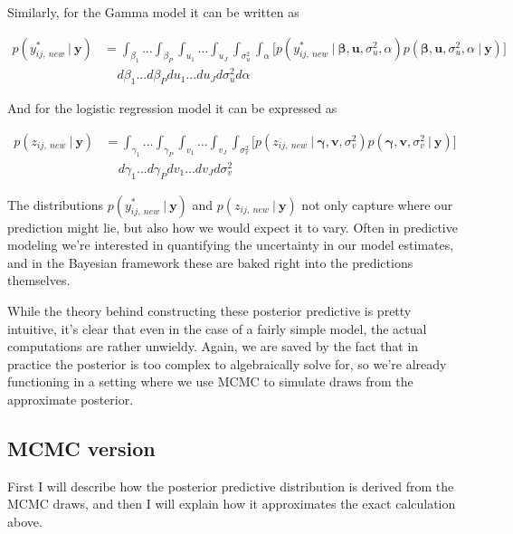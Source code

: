 \documentclass[12pt,twoside]{reedthesis}
\begin{document}
Similarly, for the Gamma model it can be written as

\[
\begin{aligned}
p(y^*_{ij, \ new} \ | \ \mathbf{y}) &=  \int_{\beta_1}  \dots \int_{\beta_P} \int_{u_1} \dots \int_{u_J} \int_{\sigma_{u}^2} \int_{\alpha} \bigg[p(y^*_{ij, \ new} \ | \ \boldsymbol{\beta}, \mathbf{u}, \sigma_{u}^2, \alpha)p(\boldsymbol{\beta}, \mathbf{u}, \sigma_{u}^2, \alpha \ | \ \mathbf{y})\bigg] \\
& \ \ \ \ \ d\beta_1 ...  d\beta_Pdu_1...du_Jd\sigma_{u}^2d\alpha
\end{aligned}
\]

And for the logistic regression model it can be expressed as

\[
\begin{aligned}
p(z_{ij, \ new} \ | \ \mathbf{y}) &=  \int_{\gamma_1}  \dots \int_{\gamma_P} \int_{v_1} \dots \int_{v_J} \int_{\sigma_{v}^2}  \bigg[p(z_{ij, \ new} \ | \ \boldsymbol{\gamma}, \mathbf{v}, \sigma_{v}^2)p(\boldsymbol{\gamma}, \mathbf{v}, \sigma_{v}^2 \ | \ \mathbf{y})\bigg] \\
& \ \ \ \ \ d\gamma_1 ...  d\gamma_Pdv_1...dv_Jd\sigma_{v}^2
\end{aligned}
\]

The distributions \(p(y^*_{ij, \ new} \ | \ \mathbf{y})\) and \(p(z_{ij, \ new}\ | \ \mathbf{y})\) not only capture where our prediction might lie, but also how we would expect it to vary. Often in predictive modeling we're interested in quantifying the uncertainty in our model estimates, and in the Bayesian framework these are baked right into the predictions themselves.

While the theory behind constructing these posterior predictive is pretty intuitive, it's clear that even in the case of a fairly simple model, the actual computations are rather unwieldy. Again, we are saved by the fact that in practice the posterior is too complex to algebraically solve for, so we're already functioning in a setting where we use MCMC to simulate draws from the approximate posterior.

\hypertarget{mcmc-version}{%
\subsection{MCMC version}\label{mcmc-version}}

First I will describe how the posterior predictive distribution is derived from the MCMC draws, and then I will explain how it approximates the exact calculation above.
\end{document}
